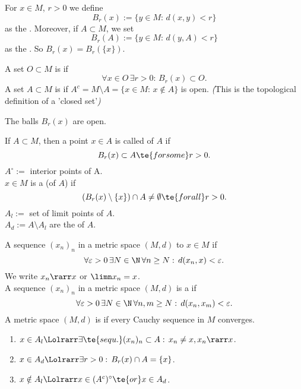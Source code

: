 \begin{definition}
For $x\in M$, $r>0$ we define 
\[B_r(x):=\{y\in M:\,d(x,y)<r\}\]
as the . Moreover, if $A\subset M$, we set
\[B_r(A):=\{y\in M:\,d(y,A)<r\}\]
as the . So $B_r(x)=B_r(\{x\})$. 
\end{definition}

\begin{definition}
A set $O\subset M$ is  if
\[\forall x\in O\,\exists r>0:\,B_r(x)\subset O.\]
A set $A\subset M$ is  if $A^c=M\setminus A=\{x\in M:\, x\notin A\}$ is open. 
\emph{(}This is the topological definition of a 'closed set'\emph{)}

The balls \(B_r(x)\) are open.
\end{definition}

\begin{definition}
If $A\subset M$, then a point $x\in A$ is called  of $A$ if 
\[B_r(x)\subset A\te{ for some }r>0.\]
$A^\circ:=$ interior points of A.\vspace{1mm}\\
$x\in M$ is a  (of $A$) if 
\[\left(B_r(x)\setminus\{x\}\right)\cap A\neq\emptyset\te{ for all }r>0.\]
$A_l:=$ set of limit points of $A$.\vspace{1mm}\\
$A_d:=A\setminus A_l$ are the  of $A$.
\end{definition}

\begin{definition}[Convergence]
A sequence $(x_n)_n$ in a metric space $(M,d)$  to $x\in M$ if
\[\forall\varepsilon>0\,\exists N\in\N\,\forall n\geq N:\, d(x_n,x)<\varepsilon.\]
We write $x_n\rarr x$ or $\limn x_n=x$.\\
A sequence $(x_n)_n$ in a metric space $(M,d)$ is a  if
\[\forall\varepsilon>0\,\exists N\in\N\,\forall n,m\geq N:\,d(x_n,x_m)<\varepsilon.\]
A metric space $(M,d)$ is  if every Cauchy sequence in $M$ converges.
\end{definition}

\begin{lem}
\begin{enumerate}[label=\alph*)]
    \item \label{i.7.a}$x\in A_l\Lolrarr\exists\te{sequ. }(x_n)_n\subset A:\, x_n\neq x,x_n\rarr x$.\label{1.7.a}
    \item $x\in A_d\Lolrarr\exists r>0:\, B_r(x)\cap A=\{x\}$.\label{1.7.b}
    \item $x\notin A_l\Lolrarr x\in (A^c)^\circ\te{ or }x\in A_d$.\label{1.7.c}
\end{enumerate}
\end{lem}

